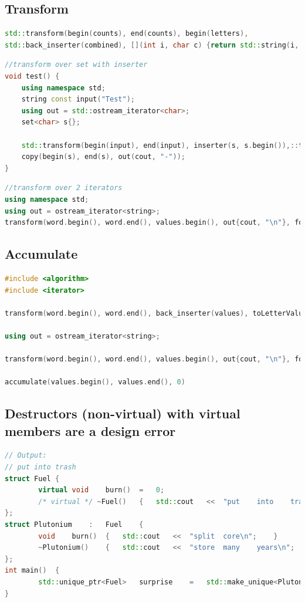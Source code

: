 \subsection{Transform}
\begin{lstlisting}[language=C++]
std::transform(begin(counts), end(counts), begin(letters),
std::back_inserter(combined), [](int i, char c) {return std::string(i, c);});
\end{lstlisting}
\begin{lstlisting}[language=C++]
//transform over set with inserter
void test() {
	using namespace std;
	string const input("Test");
	using out = std::ostream_iterator<char>;
	set<char> s{};

	std::transform(begin(input), end(input), inserter(s, s.begin()),::toupper);
	copy(begin(s), end(s), out(cout, "-"));
}
\end{lstlisting}
\begin{lstlisting}[language=C++]
//transform over 2 iterators
using namespace std;
using out = ostream_iterator<string>;
transform(word.begin(), word.end(), values.begin(), out{cout, "\n"}, formatOutput);
\end{lstlisting}
\subsection{Accumulate}
\begin{lstlisting}[language=C++]
#include <algorithm>
#include <iterator>

transform(word.begin(), word.end(), back_inserter(values), toLetterValue);

using out = ostream_iterator<string>;

transform(word.begin(), word.end(), values.begin(), out{cout, "\n"}, formatOutput);

accumulate(values.begin(), values.end(), 0)
\end{lstlisting}
\subsection{Destructors (non-virtual) with virtual members are a design error}
\begin{lstlisting}[language=C++]
// Output:
// put into	trash
struct Fuel	{
		virtual void	burn()	=	0;
		/* virtual */ ~Fuel()	{	std::cout	<<	"put	into	trash\n";	}
};
struct Plutonium	:	Fuel	{
		void	burn()	{	std::cout	<<	"split	core\n";	}
		~Plutonium()	{	std::cout	<<	"store	many	years\n";	}
};
int	main()	{
		std::unique_ptr<Fuel>	surprise	=	std::make_unique<Plutonium>();
}
\end{lstlisting}
